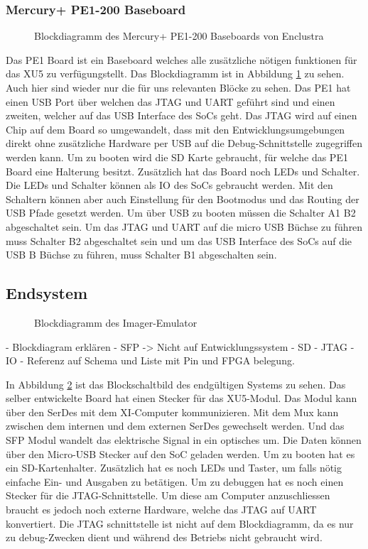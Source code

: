 \documentclass{article}
\begin{document}
\subsubsection*{Mercury+ PE1-200 Baseboard}
\begin{figure}[tb]
    \caption{Blockdiagramm des Mercury+ PE1-200 Baseboards von Enclustra}
    \label{fig:bd_pe1}
\end{figure}
Das PE1 Board ist ein Baseboard welches alle zusätzliche nötigen funktionen für das XU5 zu verfügungstellt.
Das Blockdiagramm ist in Abbildung \ref{fig:bd_pe1} zu sehen. Auch hier sind wieder nur die für uns relevanten Blöcke zu sehen. 
Das PE1 hat einen USB Port über welchen das JTAG und UART geführt sind und einen zweiten, welcher auf das USB Interface des SoCs geht. Das JTAG wird auf einen Chip auf dem Board so umgewandelt, dass mit den Entwicklungsumgebungen direkt ohne zusätzliche Hardware per USB auf die Debug-Schnittstelle zugegriffen werden kann. Um zu booten wird die SD Karte gebraucht, für welche das PE1 Board eine Halterung besitzt. Zusätzlich hat das Board noch LEDs und Schalter. Die LEDs und Schalter können als IO des SoCs gebraucht werden. Mit den Schaltern können aber auch Einstellung für den Bootmodus und das Routing der USB Pfade gesetzt werden. Um über USB zu booten müssen die Schalter A1 B2 abgeschaltet sein. Um das JTAG und UART auf die micro USB Büchse zu führen muss Schalter B2 abgeschaltet sein und um das USB Interface des SoCs auf die USB B Büchse zu führen, muss Schalter B1 abgeschalten sein. 


\subsection{Endsystem}
\begin{figure}[tb]
    \caption{Blockdiagramm des Imager-Emulator}
    \label{fig:bd_top}
\end{figure}
- Blockdiagram erklären
    - SFP
    -> Nicht auf Entwicklungssystem
    - SD
    - JTAG
    - IO
- Referenz auf Schema und Liste mit Pin und FPGA belegung.

In Abbildung \ref{fig:bd_top} ist das Blockschaltbild des endgültigen Systems zu sehen. Das selber entwickelte Board hat einen Stecker für das XU5-Modul. Das Modul kann über den SerDes mit dem XI-Computer kommunizieren. Mit dem Mux kann zwischen dem internen und dem externen SerDes gewechselt werden. Und das SFP Modul wandelt das elektrische Signal in ein optisches um. Die Daten können über den Micro-USB Stecker auf den SoC geladen werden. Um zu booten hat es ein SD-Kartenhalter. Zusätzlich hat es noch LEDs und Taster, um falls nötig einfache Ein- und Ausgaben zu betätigen. Um zu debuggen hat es noch einen Stecker für die JTAG-Schnittstelle. Um diese am Computer anzuschliessen braucht es jedoch noch externe Hardware, welche das JTAG auf UART konvertiert. Die JTAG schnittstelle ist nicht auf dem Blockdiagramm, da es nur zu debug-Zwecken dient und während des Betriebs nicht gebraucht wird.
\end{document}
